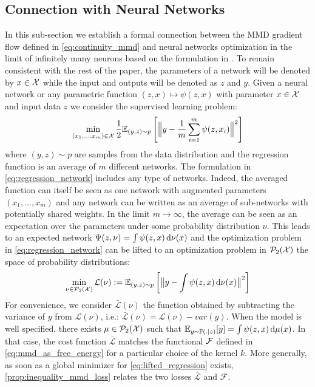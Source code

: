 \subsection{Connection with Neural Networks}\label{subsec:training_neural_networks}
In this sub-section we establish a formal connection between the MMD gradient flow defined in \cref{eq:continuity_mmd} and neural networks optimization in the limit of infinitely many neurons based on the formulation in \cite{rotskoff2018neural}. To remain consistent with the rest of the paper, the parameters of a network will be denoted by $x\in {{\mathcal X}}$ while the input and outputs will be denoted as $z$ and $y$.
 Given a neural network or any parametric function $(z,x)\mapsto \psi(z,x)$ with parameter $x \in {{\mathcal X}} $ and input data $z$ we consider the supervised learning problem:
\begin{align}\label{eq:regression_network}
	\min_{(x_1,...,x_m )\in {{\mathcal X}}} \frac{1}{2}\mathbb{E}_{(y,z)\sim p  } \left[ \Big\Vert y - \frac{1}{m}\sum_{i=1}^m\psi(z,x_i) \Big\Vert^2 \right ]
\end{align}
where $(y,z) \sim p$ are samples from the data distribution and the regression function is an average of $m$ different networks. The formulation in \cref{eq:regression_network} includes any type of networks. Indeed, the averaged function can itself be seen as one network with augmented parameters $(x_1,...,x_m)$ and any network can be written as an average of sub-networks with potentially shared weights. In the limit $m\rightarrow \infty$, the average can be seen as an expectation over the parameters under some probability distribution $\nu$. This leads to an expected network $\Psi(z,\nu) =  \int \psi(z,x) \mathop{}\!\mathrm{d} \nu(x) $ and the optimization problem in \cref{eq:regression_network} can be lifted to an optimization problem in $\mathcal{P}_2({{\mathcal X}})$ the space of probability distributions:
\begin{align}\label{eq:lifted_regression}
	\min_{\nu \in \mathcal{P}_2({{\mathcal X}})}  \mathcal{L}(\nu) :=  \mathbb{E}_{(y,z)\sim p} \left [ \big\Vert y - \int \psi(z,x) \mathop{}\!\mathrm{d} \nu(x) \big\Vert^2 \right ]
\end{align} 
For convenience, we consider $\bar{\mathcal{L}}(\nu)$ the function obtained by subtracting the variance of $y$ from $\mathcal{L}(\nu)$, i.e.: $\bar{\mathcal{L}}(\nu) = \mathcal{L}(\nu) - var(y) $. When the model is well specified, there exists $\mu \in \mathcal{P}_2({{\mathcal X}}) $ such that $\mathbb{E}_{y\sim \mathbb{P}(.|z)}[y] =  \int \psi(z,x) \mathop{}\!\mathrm{d} \mu(x)$. In that case, the cost function $\bar{\mathcal{L}}$ matches  the functional ${{\mathcal F}}$ defined in \cref{eq:mmd_as_free_energy}  for a particular choice of the kernel $k$. More generally, as soon as a global minimizer for  \cref{eq:lifted_regression} exists,  \cref{prop:inequality_mmd_loss} relates the two losses $\bar{\mathcal{L}}$ and $\mathcal{F}$.

